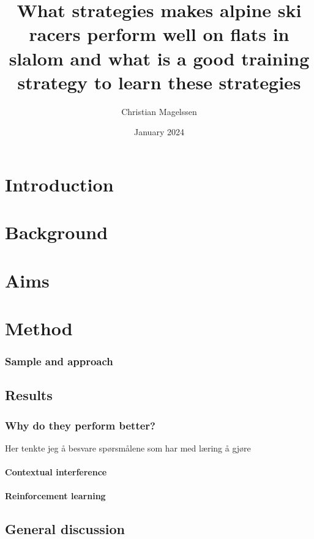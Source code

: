 \documentclass{report}
\title{What strategies makes alpine ski racers perform well on flats in slalom and what is a good training strategy to learn these strategies}
\author{Christian Magelssen}
\date{January 2024}
\begin{document}
\maketitle

\listoffigures

\chapter{Introduction}


\chapter{Background}


\chapter{Aims}




\chapter{Method}



\subsection{Sample and approach}


\section{Results}





\subsection{Why do they perform better?}
Her tenkte jeg å besvare spørsmålene som har med læring å gjøre

\subsubsection{Contextual interference}

\subsubsection{Reinforcement learning}







\section{General discussion}


\printbibliography
\end{document}
